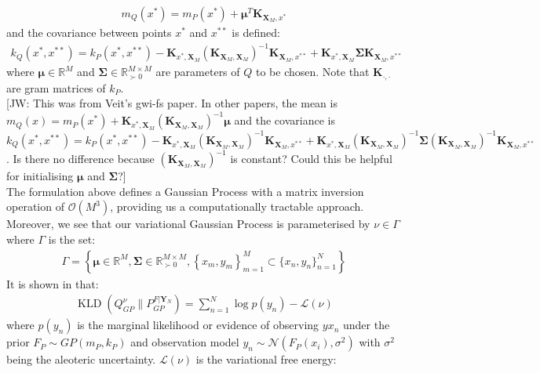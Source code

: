 \documentclass[twoside,11pt]{article}
\newcommand{\jw}[1]{{\color{gray} [JW: #1]}}
\newcommand{\KLD}{\operatorname{KLD}}
\begin{document}
\begin{align}
    m_Q(x^*) = m_P(x^*) + \mathbf{\mu}^T\mathbf{K}_{\mathbf{X}_M, x^*}
    \label{svgp-mean}
\end{align}
and the covariance between points $x^*$ and $x^{**}$ is defined:
\begin{align}
        k_Q(x^*, x^{**}) = k_P(x^*, x^{**}) - \mathbf{K}_{x^*, \mathbf{X}_M} \left(\mathbf{K}_{\mathbf{X}_M, \mathbf{X}_M}\right)^{-1}\mathbf{K}_{\mathbf{X}_M, x^{**}} + \mathbf{K}_{x^*, \mathbf{X}_M} \mathbf{\Sigma}\mathbf{K}_{\mathbf{X}_M, x^{**}}
    \label{svgp-covariance}
\end{align}
where $\mathbf{\mu} \in \mathbb{R}^{M}$ and $\mathbf{\Sigma} \in \mathbb{R}^{M\times M}_{\succ 0}$ are parameters of $Q$ to be chosen. Note that $\mathbf{K}_{\cdot, \cdot}$ are gram matrices of $k_P$.
\\\jw{This was from Veit's gwi-fs paper. In other papers, the mean is $m_Q(x) =  m_P(x^*) + \mathbf{K}_{x^*, \mathbf{X}_M} \left(\mathbf{K}_{\mathbf{X}_M, \mathbf{X}_M}\right)^{-1} \mathbf{\mu}$ and the covariance is $k_Q(x^*, x^{**}) = k_P(x^*, x^{**}) - \mathbf{K}_{x^*, \mathbf{X}_M} \left(\mathbf{K}_{\mathbf{X}_M, \mathbf{X}_M}\right)^{-1}\mathbf{K}_{\mathbf{X}_M, x^{**}} + \mathbf{K}_{x^*, \mathbf{X}_M} \left(\mathbf{K}_{\mathbf{X}_M, \mathbf{X}_M}\right)^{-1} \mathbf{\Sigma}\left(\mathbf{K}_{\mathbf{X}_M, \mathbf{X}_M}\right)^{-1}\mathbf{K}_{\mathbf{X}_M, x^{**}}$. Is there no difference because $\left(\mathbf{K}_{\mathbf{X}_M, \mathbf{X}_M}\right)^{-1}$ is constant? Could this be helpful for initialising $\mathbf{\mu}$ and $\mathbf{\Sigma}$?}
\\The formulation above defines a Gaussian Process with a matrix inversion operation of $\mathcal{O}(M^3)$, providing us a computationally tractable approach. Moreover, we see that our variational Gaussian Process is parameterised by $\nu \in \Gamma$ where $\Gamma$ is the set:
\begin{align}
    \Gamma = \left\{\mathbf{\mu} \in \mathbb{R}^{M}, \mathbf{\Sigma} \in \mathbb{R}^{M\times M}_{\succ 0}, \left\{x_m, y_m\right\}_{m=1}^{M} \subset \{x_n, y_n\}_{n=1}^{N}\right\}
    \label{svgp-parameter-set}
\end{align} 
It is shown in \cite{matthews2016sparse} that:
\begin{align}
    \KLD\left(Q_{GP}^{\nu} \Big\| P_{GP}^{F \vert \mathbf{Y}_N} \right) = \sum_{n=1}^N\log p(y_n) - \mathcal{L}(\nu)
    \label{svgp-kld-loss-equivalence}
\end{align}
where $p(y_n)$ is the marginal likelihood or evidence of observing $yx_n$ under the prior $F_P \sim GP(m_P, k_P)$ and observation model $y_n \sim \mathcal{N}(F_P(x_i), \sigma^2)$ with $\sigma^2$ being the aleoteric uncertainty. $\mathcal{L}(\nu)$ is the variational free energy:
\end{document}
